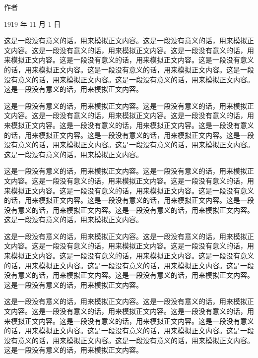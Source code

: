 \closing{作者}{1919 年 11 月 1 日}



这是一段没有意义的话，用来模拟正文内容。这是一段没有意义的话，用来模拟正文内容。这是一段没有意义的话，用来模拟正文内容。这是一段没有意义的话，用来模拟正文内容。这是一段没有意义的话，用来模拟正文内容。这是一段没有意义的话，用来模拟正文内容。这是一段没有意义的话，用来模拟正文内容。这是一段没有意义的话，用来模拟正文内容。这是一段没有意义的话，用来模拟正文内容。这是一段没有意义的话，用来模拟正文内容。

这是一段没有意义的话，用来模拟正文内容。这是一段没有意义的话，用来模拟正文内容。这是一段没有意义的话，用来模拟正文内容。这是一段没有意义的话，用来模拟正文内容。这是一段没有意义的话，用来模拟正文内容。这是一段没有意义的话，用来模拟正文内容。这是一段没有意义的话，用来模拟正文内容。这是一段没有意义的话，用来模拟正文内容。这是一段没有意义的话，用来模拟正文内容。这是一段没有意义的话，用来模拟正文内容。

这是一段没有意义的话，用来模拟正文内容。这是一段没有意义的话，用来模拟正文内容。这是一段没有意义的话，用来模拟正文内容。这是一段没有意义的话，用来模拟正文内容。这是一段没有意义的话，用来模拟正文内容。这是一段没有意义的话，用来模拟正文内容。这是一段没有意义的话，用来模拟正文内容。这是一段没有意义的话，用来模拟正文内容。这是一段没有意义的话，用来模拟正文内容。这是一段没有意义的话，用来模拟正文内容。


这是一段没有意义的话，用来模拟正文内容。这是一段没有意义的话，用来模拟正文内容。这是一段没有意义的话，用来模拟正文内容。这是一段没有意义的话，用来模拟正文内容。这是一段没有意义的话，用来模拟正文内容。这是一段没有意义的话，用来模拟正文内容。这是一段没有意义的话，用来模拟正文内容。这是一段没有意义的话，用来模拟正文内容。这是一段没有意义的话，用来模拟正文内容。这是一段没有意义的话，用来模拟正文内容。


这是一段没有意义的话，用来模拟正文内容。这是一段没有意义的话，用来模拟正文内容。这是一段没有意义的话，用来模拟正文内容。这是一段没有意义的话，用来模拟正文内容。这是一段没有意义的话，用来模拟正文内容。这是一段没有意义的话，用来模拟正文内容。这是一段没有意义的话，用来模拟正文内容。这是一段没有意义的话，用来模拟正文内容。这是一段没有意义的话，用来模拟正文内容。这是一段没有意义的话，用来模拟正文内容。

